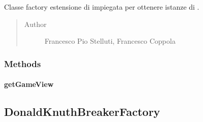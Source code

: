 \documentclass[letterpaper,10pt,italian,openany,oneside]{sphinxmanual}
\begin{document}
\begin{fulllineitems}
\label{\detokenize{source/it/unicam/cs/pa/mastermind/factories/ConsoleGameViewFactory:it.unicam.cs.pa.mastermind.factories.ConsoleGameViewFactory}}
Classe factory estensione di  impiegata per ottenere istanze di .
\begin{quote}\begin{description}
\item[{Author}] \leavevmode
Francesco Pio Stelluti, Francesco Coppola

\end{description}\end{quote}

\end{fulllineitems}



\subsubsection{Methods}
\label{\detokenize{source/it/unicam/cs/pa/mastermind/factories/ConsoleGameViewFactory:methods}}

\paragraph{getGameView}
\label{\detokenize{source/it/unicam/cs/pa/mastermind/factories/ConsoleGameViewFactory:getgameview}}

\begin{fulllineitems}
\label{\detokenize{source/it/unicam/cs/pa/mastermind/factories/ConsoleGameViewFactory:it.unicam.cs.pa.mastermind.factories.ConsoleGameViewFactory.getGameView()}}
\end{fulllineitems}



\subsection{DonaldKnuthBreakerFactory}
\label{\detokenize{source/it/unicam/cs/pa/mastermind/factories/DonaldKnuthBreakerFactory:donaldknuthbreakerfactory}}\label{\detokenize{source/it/unicam/cs/pa/mastermind/factories/DonaldKnuthBreakerFactory::doc}}
\end{document}

